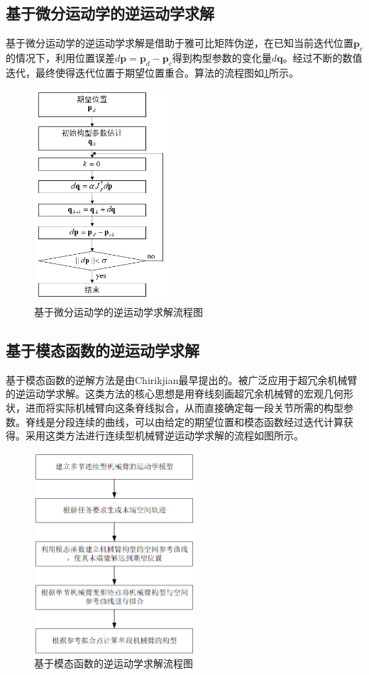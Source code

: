 \subsection{基于微分运动学的逆运动学求解}
基于微分运动学的逆运动学求解是借助于雅可比矩阵伪逆，在已知当前迭代位置$ \mathbf{p}_c $的情况下，利用位置误差$ d\mathbf{p} = \mathbf{p}_d -\mathbf{p}_c $得到构型参数的变化量$d\mathbf{q}$。经过不断的数值迭代，最终使得迭代位置于期望位置重合\cite{webster_closed-form_2009}。算法的流程图如\ref{fig:flowchart}所示。
\begin{figure}[!htpb]
	\centering
	\includegraphics[width=5cm]{figures/flowchart.png}
	\caption{基于微分运动学的逆运动学求解流程图 }
	\label{fig:flowchart}
\end{figure}
\subsection{基于模态函数的逆运动学求解}
基于模态函数的逆解方法是由Chirikjian最早提出的\cite{chirikjian_obstacle_1990, chirikjian_geometric_1992}。被广泛应用于超冗余机械臂的逆运动学求解。这类方法的核心思想是用脊线刻画超冗余机械臂的宏观几何形状，进而将实际机械臂向这条脊线拟合，从而直接确定每一段关节所需的构型参数。脊线是分段连续的曲线，可以由给定的期望位置和模态函数经过迭代计算获得。采用这类方法进行连续型机械臂逆运动学求解的流程如图所示。
\begin{figure}[!htpb]
	\centering
	\includegraphics[width=6cm]{figures/flowchart_modal.png}
	\caption{基于模态函数的逆运动学求解流程图 }
	\label{fig:flowchart_modal}
\end{figure}